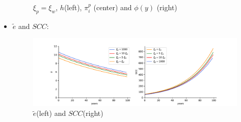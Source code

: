\documentclass{article}
\begin{document}
\begin{itemize}
\begin{figure}[H]
    \caption{$\xi_p=\xi_w$, $h$(left), $\pi_i^p$ (center) and $\phi(y)$ (right)}
    \label{fig:notebook/phi_x1}
\end{figure}
\item$\tilde e$ and $SCC$:
    \begin{figure}[htpb]
        \centering
        \includegraphics[width= \linewidth]{notebook/scc.pdf}
        \caption{$\tilde e$(left) and $SCC$(right)}
        \label{fig:notebook/scc}
    \end{figure}
\end{itemize}
\end{document}
